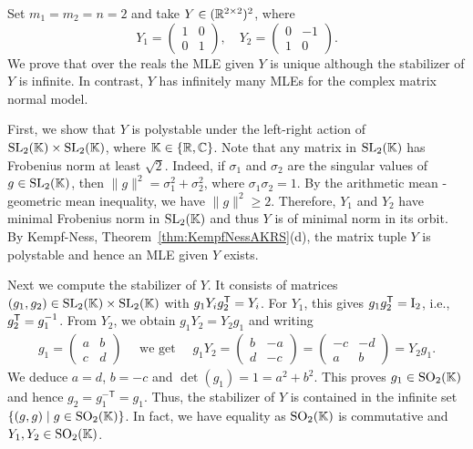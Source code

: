 \begin{example}  	\label{ex:PolystableNotStableUniqueMLE}
	Set $m_1 = m_2 = n = 2$ and take $Y \in (\mathbb R^{2 \times 2})^2$, where
	\begin{equation*}
		Y_1 = \begin{pmatrix} 1 & 0 \\ 0 & 1 \end{pmatrix} , \quad
		Y_2 = \begin{pmatrix} 0 & -1 \\ 1 & 0 \end{pmatrix}.
	\end{equation*}
	We prove that over the reals the MLE given $Y$ is unique although the stabilizer of $Y$ is infinite. In contrast, $Y$ has infinitely many MLEs for the complex matrix normal model.
	
	First, we show that $Y$ is polystable under the left-right action of $\operatorname{SL}_2(\mathbb K) \times \operatorname{SL}_2(\mathbb K)$, where $\mathbb K \in \{\mathbb R, \mathbb C\}$. Note that any matrix in $\operatorname{SL}_2(\mathbb K)$ has Frobenius norm at least $\sqrt{2}$. Indeed, if $\sigma_1$ and $\sigma_2$ are the singular values of $g \in \operatorname{SL}_2(\mathbb K)$, then $\| g \|^2 = \sigma_1^2 + \sigma_2^2$, where $\sigma_1 \sigma_2 = 1$. By the arithmetic mean - geometric mean inequality, we have $\| g \|^2 \geq 2$. Therefore, $Y_1$ and $Y_2$ have minimal Frobenius norm in $\operatorname{SL}_2(\mathbb K)$ and thus $Y$ is of minimal norm in its orbit. By Kempf-Ness, Theorem~\ref{thm:KempfNessAKRS}(d), the matrix tuple $Y$ is polystable and hence an MLE given $Y$ exists.
	
	Next we compute the stabilizer of $Y$. It consists of matrices $(g_1,g_2) \in \operatorname{SL}_2(\mathbb K) \times \operatorname{SL}_2(\mathbb K)$ with $g_1 Y_i g_2^{\mathsf{T}} = Y_i$. For $Y_1$, this gives $g_1 g_2^{\mathsf{T}} = \operatorname{I}_2$, i.e., $g_2^{\mathsf{T}} = g_1^{-1}$.  From $Y_2$, we obtain $g_1 Y_2 = Y_2 g_1$ and writing
		\begin{align*}
			g_1 = \begin{pmatrix} a & b\\ c & d \end{pmatrix}
			\quad \text{ we get } \quad
			g_1 Y_2 = \begin{pmatrix} b & -a\\ d & -c \end{pmatrix} = \begin{pmatrix} -c & -d\\ a & b \end{pmatrix} = Y_2 g_1 .
		\end{align*}
	We deduce $a = d$, $b = -c$ and $\det(g_1) = 1 = a^2 + b^2$. This proves $g_1 \in \operatorname{SO}_2(\mathbb K)$ and hence $g_2 = g_1^{-\mathsf{T}} = g_1$. Thus, the stabilizer of $Y$ is contained in the infinite set $\lbrace (g,g) \mid g \in \operatorname{SO}_2(\mathbb K) \rbrace$. In fact, we have equality as $\operatorname{SO}_2(\mathbb K)$ is commutative and $Y_1,Y_2 \in \operatorname{SO}_2(\mathbb K)$.
	

\end{example}
